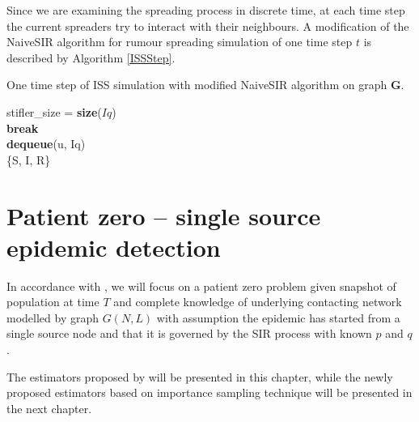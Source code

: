 \documentclass[times, utf8, diplomski]{fer}
\begin{document}
Since we are examining the spreading process in discrete time, at each time step the current spreaders try to interact with their neighbours. A modification of the NaiveSIR algorithm for rumour spreading simulation of one time step $t$ is described by Algorithm \ref{ISSStep}. 
 
\begin{algorithm}
\caption{One time step of ISS simulation with modified NaiveSIR algorithm on graph $\mathbf{G}$.}
 \label{ISSStep}
 stifler\_size = \textbf{size}($Iq$)\\
  {
  {
 \textbf{break}\\
 }
 \textbf{dequeue}(u, Iq)\\
  }
  \Return \{S, I, R\}
\end{algorithm}

\chapter{Patient zero -- single source epidemic detection}
\label{PZ}

In accordance with \citet{Nino}, we will focus on a patient zero problem given snapshot of population at time $T$ and complete knowledge of underlying contacting network modelled by graph $G(N, L)$ with  assumption the epidemic has started from a single source node and that it is governed by the SIR process with known $p$ and $q$. 

 The estimators proposed by \citet{Nino} will be presented in this chapter, while the newly proposed estimators based on importance sampling  technique will be presented in the next chapter.
\end{document}
